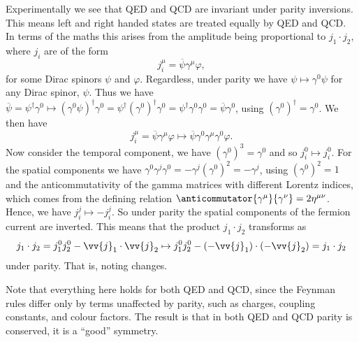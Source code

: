 \documentclass[fleqn]{NotesClass}
\newcommand{\hermit}{\dagger}
\newcommand{\diracadjoint}[1]{\overbar{#1}}
\newcommand{\minkowskiMetric}{\eta}
\begin{document}
    Experimentally we see that QED and QCD are invariant under parity inversions.
    This means left and right handed states are treated equally by QED and QCD.
    In terms of the maths this arises from the amplitude being proportional to \(j_1 \cdot j_2\), where \(j_i\) are of the form
    \begin{equation}
        j_i^\mu = \overbar{\psi} \gamma^\mu \varphi,
    \end{equation}
    for some Dirac spinors \(\psi\) and \(\varphi\).
    Regardless, under parity we have \(\psi \mapsto \gamma^0 \psi\) for any Dirac spinor, \(\psi\).
    Thus we have \(\diracadjoint{\psi} = \psi^\hermit \gamma^0 \mapsto (\gamma^0\psi)^\hermit\gamma^0 = \psi^\hermit (\gamma^0)^\hermit \gamma^0 = \psi^\hermit \gamma^0 \gamma^0 = \diracadjoint{\psi}\gamma^0\), using \((\gamma^0)^\hermit = \gamma^0\).
    We then have
    \begin{equation}
        j_i^\mu = \diracadjoint{\psi} \gamma^\mu \varphi \mapsto \diracadjoint{\psi} \gamma^0 \gamma^\mu \gamma^0 \varphi.
    \end{equation}
    Now consider the temporal component, we have \((\gamma^0)^3 = \gamma^0\) and so \(j_i^0 \mapsto j_i^0\).
    For the spatial components we have \(\gamma^0 \gamma^j \gamma^0 = -\gamma^j (\gamma^0)^2 = -\gamma^j\), using \((\gamma^0)^2 = 1\) and the anticommutativity of the gamma matrices with different Lorentz indices, which comes from the defining relation \(\anticommutator{\gamma^\mu}{\gamma^\nu} = 2\minkowskiMetric^{\mu\nu}\).
    Hence, we have \(j_i^j \mapsto -j_i^j\).
    So under parity the spatial components of the fermion current are inverted.
    This means that the product \(j_1 \cdot j_2\) transforms as
    \begin{equation}
        j_1 \cdot j_2 = j_1^0 j_2^0 - \vv{j}_1 \cdot \vv{j}_2 \mapsto j_1^0 j_2^0 - (-\vv{j}_1) \cdot (-\vv{j}_2) = j_1 \cdot j_2
    \end{equation}
    under parity.
    That is, noting changes.
    
    Note that everything here holds for both QED and QCD, since the Feynman rules differ only by terms unaffected by parity, such as charges, coupling constants, and colour factors.
    The result is that in both QED and QCD parity is conserved, it is a \enquote{good} symmetry.
    
\end{document}
